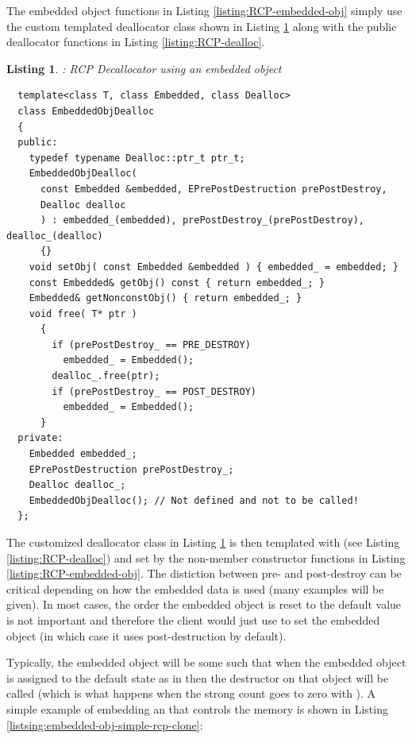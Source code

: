 \documentclass[pdf,ps2pdf,11pt]{SANDreport}
\newtheorem{listing}{Listing}
\begin{document}
The embedded object functions in Listing
{}\ref{listing:RCP-embedded-obj} simply use the custom templated
deallocator class {} shown in Listing
{}\ref{listing:RCP-EmbeddedObjDealloc} along with the public
deallocator functions in Listing {}\ref{listing:RCP-dealloc}.


\begin{listing}: RCP Decallocator using an embedded object \\
\label{listing:RCP-EmbeddedObjDealloc}
{\small\begin{verbatim}
  template<class T, class Embedded, class Dealloc>
  class EmbeddedObjDealloc
  {
  public:
    typedef typename Dealloc::ptr_t ptr_t;
    EmbeddedObjDealloc(
      const Embedded &embedded, EPrePostDestruction prePostDestroy,
      Dealloc dealloc
      ) : embedded_(embedded), prePostDestroy_(prePostDestroy), dealloc_(dealloc)
      {}
    void setObj( const Embedded &embedded ) { embedded_ = embedded; }
    const Embedded& getObj() const { return embedded_; }
    Embedded& getNonconstObj() { return embedded_; }
    void free( T* ptr )
      {
        if (prePostDestroy_ == PRE_DESTROY)
          embedded_ = Embedded();
        dealloc_.free(ptr);
        if (prePostDestroy_ == POST_DESTROY)
          embedded_ = Embedded();
      }
  private:
    Embedded embedded_;
    EPrePostDestruction prePostDestroy_;
    Dealloc dealloc_;
    EmbeddedObjDealloc(); // Not defined and not to be called!
  };
\end{verbatim}}
\end{listing}


The customized deallocator class in Listing
{}\ref{listing:RCP-EmbeddedObjDealloc} is then templated with
{} (see Listing {}\ref{listing:RCP-dealloc}) and
set by the non-member constructor functions in Listing
{}\ref{listing:RCP-embedded-obj}.  The distiction between pre- and
post-destroy can be critical depending on how the embedded data is
used (many examples will be given).  In most cases, the order the
embedded object is reset to the default value is not important and
therefore the client would just use {} to
set the embedded object (in which case it uses post-destruction by
default).

Typically, the embedded object will be some {} such that when
the embedded object is assigned to the default state as in
{} then the destructor on that object
will be called (which is what happens when the strong count goes to
zero with {}).  A simple example of embedding an {}
that controls the memory is shown in Listing
{}\ref{listsing:embedded-obj-simple-rcp-clone}:
\end{document}
